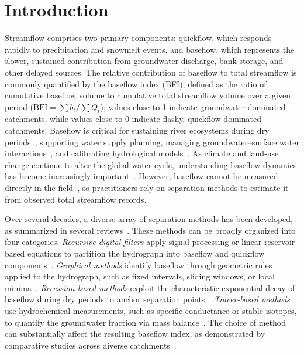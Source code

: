 \documentclass[hydrology,article,submit,pdftex,moreauthors]{Definitions/mdpi}
\begin{document}
\section{Introduction}
\label{sec:introduction}

Streamflow comprises two primary components: quickflow, which responds rapidly to precipitation and snowmelt events, and baseflow, which represents the slower, sustained contribution from groundwater discharge, bank storage, and other delayed sources. The relative contribution of baseflow to total streamflow is commonly quantified by the baseflow index (BFI), defined as the ratio of cumulative baseflow volume to cumulative total streamflow volume over a given period ($\mathrm{BFI} = \sum b_t / \sum Q_t$); values close to 1 indicate groundwater-dominated catchments, while values close to 0 indicate flashy, quickflow-dominated catchments. Baseflow is critical for sustaining river ecosystems during dry periods~\cite{Smakhtin2001}, supporting water supply planning, managing groundwater--surface water interactions~\cite{Barlow2012}, and calibrating hydrological models~\cite{ChapmanMaxwell1996,Eckhardt2005}. As climate and land-use change continue to alter the global water cycle, understanding baseflow dynamics has become increasingly important~\cite{Tan2020,Jasechko2024}. However, baseflow cannot be measured directly in the field~\cite{ChapmanMaxwell1996}, so practitioners rely on separation methods to estimate it from observed total streamflow records.

Over several decades, a diverse array of separation methods has been developed, as summarized in several reviews~\cite{Tallaksen1995,McMahon2021}. These methods can be broadly organized into four categories. \textit{Recursive digital filters} apply signal-processing or linear-reservoir-based equations to partition the hydrograph into baseflow and quickflow components~\cite{Lyne1979,Nathan1990,Chapman1991,Eckhardt2005}. \textit{Graphical methods} identify baseflow through geometric rules applied to the hydrograph, such as fixed intervals, sliding windows, or local minima~\cite{Sloto1996}. \textit{Recession-based methods} exploit the characteristic exponential decay of baseflow during dry periods to anchor separation points~\cite{Tallaksen1995,Rutledge1998}. \textit{Tracer-based methods} use hydrochemical measurements, such as specific conductance or stable isotopes, to quantify the groundwater fraction via mass balance~\cite{Stewart2007,Klaus2013}. The choice of method can substantially affect the resulting baseflow index, as demonstrated by comparative studies across diverse catchments~\cite{Eckhardt2008,Lott2016}.
\end{document}
